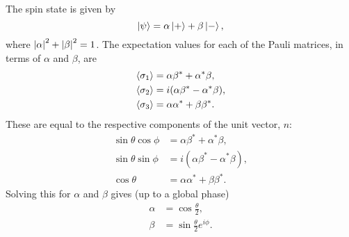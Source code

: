 \documentclass[
a4paper,
10pt,
twoside,
]{article}
\begin{document}
The spin state is given by
\begin{equation}
	\ket{\psi} = \alpha \ket{+} + \beta \ket{-},
\end{equation}
where $\abs{\alpha}^2 + \abs{\beta}^2 = 1$.
The expectation values for each of the Pauli matrices, in terms of $\alpha$ and $\beta$, are
\begin{align}
	\ev{\sigma_1} &= \alpha\beta^* + \alpha^* \beta,\\
	\ev{\sigma_2} &= i(\alpha\beta^* - \alpha^* \beta),\\
	\ev{\sigma_3} &= \alpha\alpha^* + \beta\beta^*.
\end{align}
These are equal to the respective components of the unit vector, $n$:
\begin{align}
	\sin\theta\cos\phi &= \alpha\beta^* + \alpha^* \beta,\\
	\sin\theta\sin\phi &= i(\alpha\beta^* - \alpha^* \beta),\\
	\cos\theta &= \alpha\alpha^* + \beta\beta^*.
\end{align}
Solving this for $\alpha$ and $\beta$ gives (up to a global phase)
\begin{align}
	\alpha &= \cos\frac{\theta}{2},\\
	\beta &= \sin\frac{\theta}{2} e^{i\phi}.
\end{align}

\printbib


\stopmcols
\end{document}

